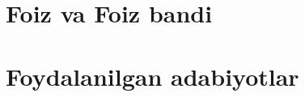\documentclass[
  letterpaper,
  DIV=11,
  numbers=noendperiod,
  oneside]{scrreprt}
\newlength{\cslhangindent}
\newlength{\cslentryspacingunit} %
\newenvironment{CSLReferences}[2] %
 {%
  \setlength{\parindent}{0pt}
  \ifodd #1
  \let\oldpar\par
  \def\par{\hangindent=\cslhangindent\oldpar}
  \fi
  \setlength{\parskip}{#2\cslentryspacingunit}
 }%
 {}
\begin{document}
\hypertarget{foiz-va-foiz-bandi}{%
\chapter*{Foiz va Foiz bandi}\label{foiz-va-foiz-bandi}}



\hypertarget{foydalanilgan-adabiyotlar}{%
\chapter*{Foydalanilgan adabiyotlar}\label{foydalanilgan-adabiyotlar}}


\hypertarget{refs}{}
\begin{CSLReferences}{0}{0}
\end{CSLReferences}
\end{document}
